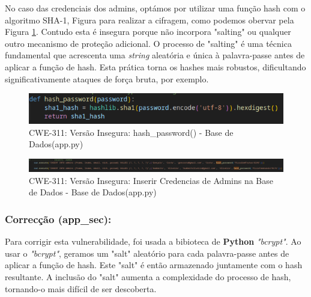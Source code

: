 No caso das credenciais dos admins, optámos por utilizar uma função hash com o algoritmo SHA-1, Figura  para realizar a cifragem, como podemos obervar pela Figura  \ref{fig:cwe311-hashFuntion}. Contudo esta é insegura porque não incorpora "salting" ou qualquer outro mecanismo de proteção adicional. O processo de "salting" é uma técnica fundamental que acrescenta uma \textit{string} aleatória e única à palavra-passe antes de aplicar a função de hash. Esta prática torna os hashes mais robustos, dificultando significativamente ataques de força bruta, por exemplo.

\begin{figure}[H]
  \centering
  \includegraphics[width=16cm]{images/CWE-311-hashFunction.png}
  \caption{CWE-311: Versão Insegura: hash\_password() - Base de Dados(app.py)}
  \label{fig:cwe311-hashFuntion}
\end{figure}

\begin{figure}[H]
  \centering
  \includegraphics[width=16cm]{images/CWE-311-Admins.png}
  \caption{CWE-311: Versão Insegura: Inserir Credencias de Admins na Base de Dados - Base de Dados(app.py)}
  \label{fig:cwe311-admins}
\end{figure}


\subsubsection{Correcção (app\_sec):}

Para corrigir esta vulnerabilidade, foi usada a bibioteca de \textbf{Python} \textit{"bcrypt"}. Ao usar o \textit{"bcrypt"}, geramos um "salt" aleatório para cada palavra-passe antes de aplicar a função de hash. Este "salt" é então armazenado juntamente com o hash resultante. A inclusão do "salt" aumenta a complexidade do processo de hash, tornando-o mais difícil de ser descoberta.

